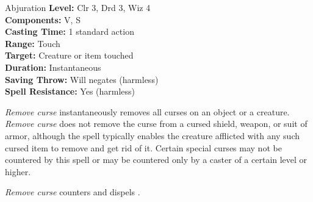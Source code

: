{Abjuration}
{
	\textbf{Level:}
	Clr 3, Drd 3, Wiz 4\\
	\textbf{Components:}
	V, S\\
	\textbf{Casting Time:}
	1 standard action\\
	\textbf{Range:}
	Touch\\
	\textbf{Target:}
	Creature or item touched\\
	\textbf{Duration:}
	Instantaneous\\
	\textbf{Saving Throw:}
	Will negates (harmless)\\
	\textbf{Spell Resistance:}
	Yes (harmless)\\
}
{
	\emph{Remove curse} instantaneously removes all curses on an object or a creature. \emph{Remove curse} does not remove the curse from a cursed shield, weapon, or suit of armor, although the spell typically enables the creature afflicted with any such cursed item to remove and get rid of it. Certain special curses may not be countered by this spell or may be countered only by a caster of a certain level or higher.

	\emph{Remove curse} counters and dispels .

}
